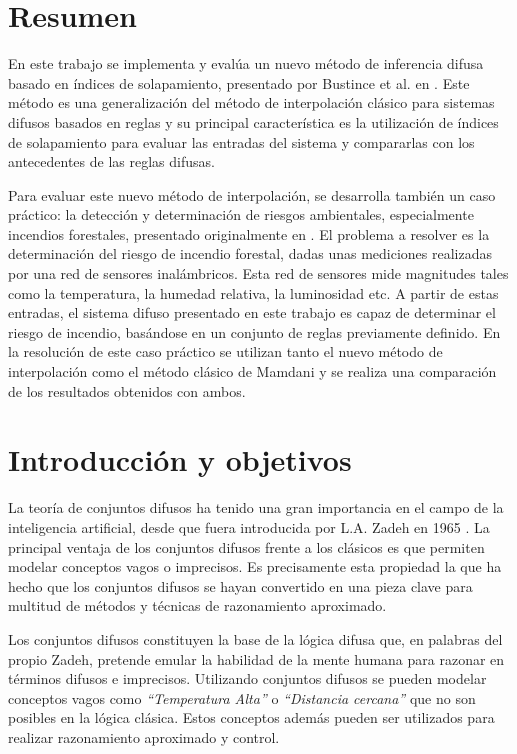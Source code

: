 
\chapter{Resumen}
En este trabajo se implementa y evalúa un nuevo método de inferencia difusa basado en índices de solapamiento, presentado por Bustince et al. en \cite{bustince2013overlap}. Este método es una generalización del método de interpolación clásico para sistemas difusos basados en reglas y su principal característica es la utilización de índices de solapamiento \cite{bustince2009overlap} para evaluar las entradas del sistema y compararlas con los antecedentes de las reglas difusas.

Para evaluar este nuevo método de interpolación, se desarrolla también un caso práctico: la detección y determinación de riesgos ambientales, especialmente incendios forestales, presentado originalmente en \cite{bolourchi2013}. El problema a resolver es la determinación del riesgo de incendio forestal, dadas unas mediciones realizadas por una red de sensores inalámbricos. Esta red de sensores mide magnitudes tales como la temperatura, la humedad relativa, la luminosidad etc. A partir de estas entradas, el sistema difuso presentado en este trabajo es capaz de determinar el riesgo de incendio, basándose en un conjunto de reglas previamente definido. En la resolución de este caso práctico se utilizan tanto el nuevo método de interpolación como el método clásico de Mamdani \cite{Mamdani1975} y se realiza una comparación de los resultados obtenidos con ambos.

\chapter{Introducción y objetivos}
La teoría de conjuntos difusos ha tenido una gran importancia en el campo de la inteligencia artificial, desde que fuera introducida por L.A. Zadeh en 1965 \cite{Zadeh65}. La principal ventaja de los conjuntos difusos frente a los clásicos es que permiten modelar conceptos vagos o imprecisos. Es precisamente esta propiedad la que ha hecho que los conjuntos difusos se hayan convertido en una pieza clave para multitud de métodos y técnicas de razonamiento aproximado.

Los conjuntos difusos constituyen la base de la lógica difusa que, en palabras del propio Zadeh, pretende emular la habilidad de la mente humana para razonar en términos difusos e imprecisos. Utilizando conjuntos difusos se pueden modelar conceptos vagos como \emph{``Temperatura Alta''} o \emph{``Distancia cercana''} que no son posibles en la lógica clásica. Estos conceptos además pueden ser utilizados para realizar razonamiento aproximado y control.

